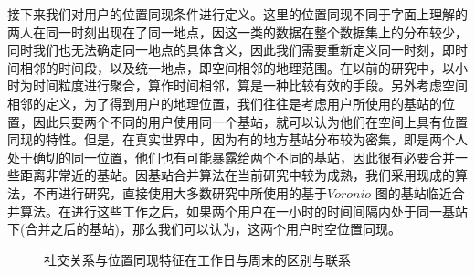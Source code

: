 接下来我们对用户的位置同现条件进行定义。这里的位置同现不同于字面上理解的两人在同一时刻出现在了同一地点，因这一类的数据在整个数据集上的分布较少，同时我们也无法确定同一地点的具体含义，因此我们需要重新定义同一时刻，即时间相邻的时间段，以及统一地点，即空间相邻的地理范围。在以前的研究中，以小时为时间粒度进行聚合，算作时间相邻，算是一种比较有效的手段。另外考虑空间相邻的定义，为了得到用户的地理位置，我们往往是考虑用户所使用的基站的位置，因此只要两个不同的用户使用同一个基站，就可以认为他们在空间上具有位置同现的特性。但是，在真实世界中，因为有的地方基站分布较为密集，即是两个人处于确切的同一位置，他们也有可能暴露给两个不同的基站，因此很有必要合并一些距离非常近的基站。因基站合并算法在当前研究中较为成熟，我们采用现成的算法，不再进行研究，直接使用大多数研究中所使用的基于$Voronio$ 图的基站临近合并算法。在进行这些工作之后，如果两个用户在一小时的时间间隔内处于同一基站下(合并之后的基站)，那么我们可以认为，这两个用户时空位置同现。



\begin{figure}[!ht]
    \centering
    \hspace{7em} %
    \caption{社交关系与位置同现特征在工作日与周末的区别与联系}
    \label{fig-spatialhomo}
\end{figure}

